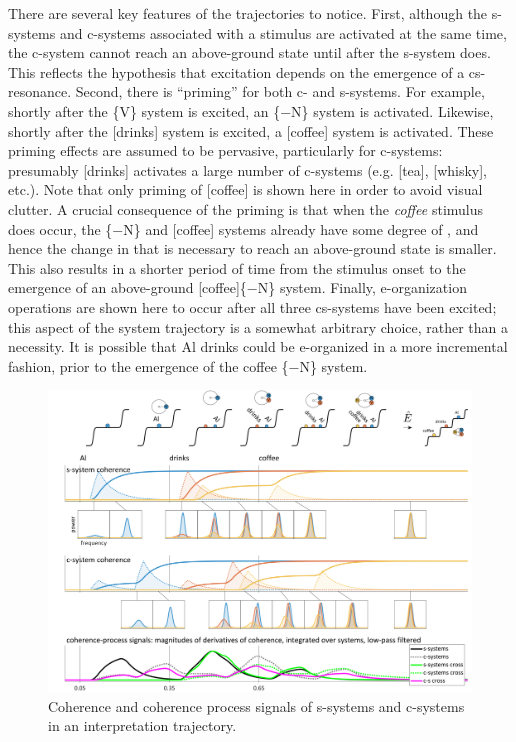   There are several key features of the trajectories to notice. First, although the s-sys\-tems and c-sys\-tems associated with a stimulus are activated at the same time, the c-sys\-tem cannot reach an above-ground state until after the s-sys\-tem does. This reflects the hypothesis that excitation depends on the emergence of a cs-resonance. Second, there is “priming” for both c- and s-sys\-tems. For example, shortly after the \{V\} system is excited, an \{−N\} system is activated. Likewise, shortly after the [drinks] system is excited, a [coffee] system is activated. These priming effects are assumed to be pervasive, particularly for c-sys\-tems: presumably [drinks] activates a large number of c-sys\-tems (e.g. [tea], [whisky], etc.). Note that only priming of [coffee] is shown here in order to avoid visual clutter. A crucial consequence of the priming is that when the \textit{coffee} stimulus does occur, the \{−N\} and [coffee] systems already have some degree of , and hence the change in  that is necessary to reach an above-ground state is smaller. This also results in a shorter period of time from the stimulus onset to the emergence of an above-ground [coffee]\{−N\} system. Finally, e-or\-ga\-ni\-za\-tion operations are shown here to occur after all three cs-sys\-tems have been excited; this aspect of the system trajectory is a somewhat arbitrary choice, rather than a necessity. It is possible that {\textbar}Al drinks{\textbar} could be e-organized in a more incremental fashion, prior to the emergence of the {\textbar}coffee \{−N\}{\textbar} system. 

  
\begin{figure}
\includegraphics[width=\textwidth]{figures/Tilsen-img141.png}
\caption{Coherence and coherence process signals of s-sys\-tems and c-sys\-tems in an interpretation trajectory.}
\label{fig:6:22}
\end{figure}
 

